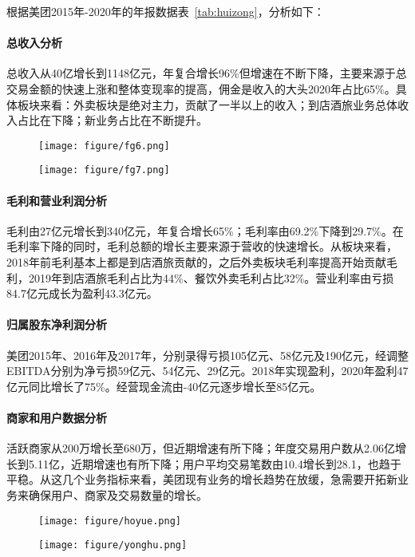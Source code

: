 \documentclass[UTF8,a4paper,12pt,lang=cn,fontset = windows]{elegantpaper} %
\begin{document}
根据美团2015年-2020年的年报数据表~\ref{tab:huizong}，分析如下：
\paragraph{总收入分析}
总收入从40亿增长到1148亿元，年复合增长96\%但增速在不断下降，主要来源于总交易金额的快速上涨和整体变现率的提高，佣金是收入的大头2020年占比65\%。具体板块来看：外卖板块是绝对主力，贡献了一半以上的收入；到店酒旅业务总体收入占比在下降；新业务占比在不断提升。
\begin{figure}[htbp]
  \centering
  \begin{minipage}[t]{0.48\textwidth}
  \centering
  \texttt{[image: figure/fg6.png]}
  \end{minipage}
  \begin{minipage}[t]{0.48\textwidth}
  \centering
  \texttt{[image: figure/fg7.png]}
  \end{minipage}
  \end{figure}

\paragraph{毛利和营业利润分析}
毛利由27亿元增长到340亿元，年复合增长65\%；毛利率由69.2\%下降到29.7\%。在毛利率下降的同时，毛利总额的增长主要来源于营收的快速增长。从板块来看，2018年前毛利基本上都是到店酒旅贡献的，之后外卖板块毛利率提高开始贡献毛利，2019年到店酒旅毛利占比为44\%、餐饮外卖毛利占比32\%。营业利率由亏损84.7亿元成长为盈利43.3亿元。
\paragraph{归属股东净利润分析} 
美团2015年、2016年及2017年，分别录得亏损105亿元、58亿元及190亿元，经调整EBITDA分别为净亏损59亿元、54亿元、29亿元。2018年实现盈利，2020年盈利47亿元同比增长了75\%。经营现金流由-40亿元逐步增长至85亿元。
\paragraph{商家和用户数据分析}
活跃商家从200万增长至680万，但近期增速有所下降；年度交易用户数从2.06亿增长到5.11亿，近期增速也有所下降；用户平均交易笔数由10.4增长到28.1，也趋于平稳。从这几个业务指标来看，美团现有业务的增长趋势在放缓，急需要开拓新业务来确保用户、商家及交易数量的增长。
\begin{figure}[htbp]
  \centering
  \begin{minipage}[t]{0.48\textwidth}
  \centering
  \texttt{[image: figure/hoyue.png]}
  \end{minipage}
  \begin{minipage}[t]{0.48\textwidth}
  \centering
  \texttt{[image: figure/yonghu.png]}
  \end{minipage}
  \end{figure}
\end{document}
